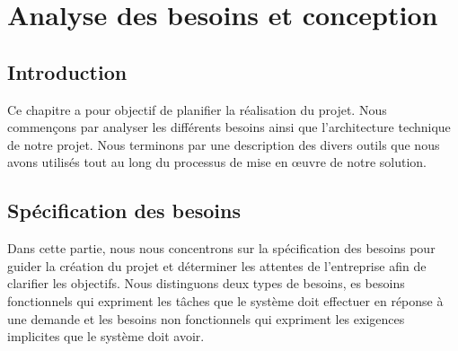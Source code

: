 \chapter{Analyse des besoins et conception}
\section*{Introduction}
Ce chapitre a pour objectif de planifier la réalisation du projet. Nous commençons par analyser les différents besoins ainsi que l'architecture technique de notre projet. Nous terminons par une description des divers outils que nous avons utilisés tout au long du processus de mise en œuvre de notre solution.
\section{Spécification des besoins}
Dans cette partie, nous nous concentrons sur la spécification des besoins pour guider la création du projet et déterminer les attentes de l'entreprise afin de clarifier les objectifs. Nous distinguons deux types de besoins, es besoins fonctionnels qui expriment les tâches que le système doit effectuer en réponse à une demande et les besoins non fonctionnels qui expriment les exigences implicites que le système doit avoir.

